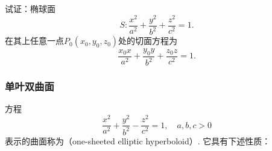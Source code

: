\begin{example}
试证：椭球面\[
S: \frac{x^2}{a^2} + \frac{y^2}{b^2} + \frac{z^2}{c^2} = 1.
\]在其上任意一点\(P_0(x_0,y_0,z_0)\)处的切面方程为
\begin{equation}\label{equation:解析几何.椭球面的切平面}
	\frac{x_0 x}{a^2} + \frac{y_0 y}{b^2} + \frac{z_0 z}{c^2} = 1.
\end{equation}
\end{example}

\subsubsection{单叶双曲面}
方程\begin{equation}\label{equation:解析几何.单叶双曲面}
	\frac{x^2}{a^2}+\frac{y^2}{b^2}-\frac{z^2}{c^2}=1,
	\quad a,b,c>0
\end{equation}
表示的曲面称为（one-sheeted elliptic hyperboloid）.
它具有下述性质：
